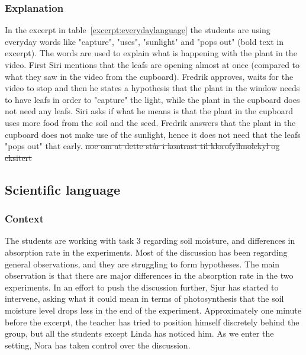 \subsubsection*{Explanation}
In the excerpt in table~\ref{excerpt:everydaylanguage} the students are using everyday words like 
"capture", "uses", "sunlight" and "pops out" (bold text in excerpt). The words are used to explain what is happening with the plant in the video. First Siri mentions that the leafs are opening almost at once (compared to what they saw in the video from the cupboard). Fredrik approves, waits for the video to stop and then he states a hypothesis that the plant in the window needs to have leafs in order to "capture" the light, while the plant in the cupboard does not need any leafs. Siri asks if what he means is that the plant in the cupboard uses more food from the soil and the seed. Fredrik answers that the plant in the cupboard does not make use of the sunlight, hence it does not need that the leafs "pops out" that early. \sout{noe om at dette står i kontrast til klorofyllmolekyl og eksitert}

\subsection{Scientific language}
\subsubsection*{Context}
The students are working with task 3 regarding soil moisture, and differences in absorption rate in the experiments. Most of the discussion has been regarding general observations, and they are struggling to form hypotheses. The main observation is that there are major differences in the absorption rate in the two experiments. In an effort to push the discussion further, Sjur has started to intervene, asking what it could mean in terms of photosynthesis that the soil moisture level drops less in the end of the experiment. Approximately one minute before the excerpt, the teacher has tried to position himself discretely behind the group, but all the students except Linda has noticed him. As we enter the setting, Nora has taken control over the discussion.

